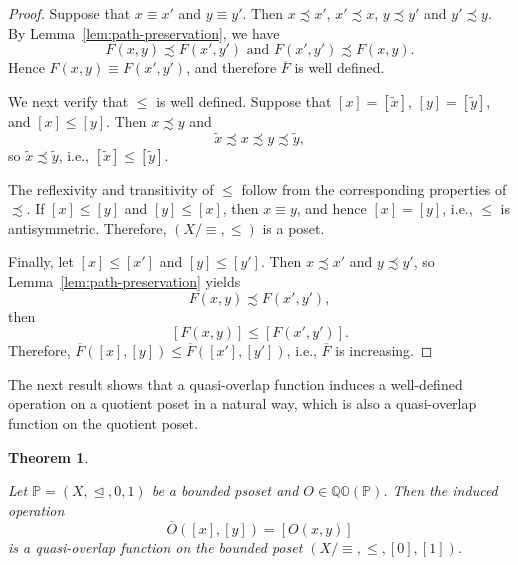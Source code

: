 \documentclass[preprint,12pt]{elsarticle}
\newtheorem{theorem}{Theorem}[section]
\begin{document}
\begin{proof}
Suppose that $x\equiv x'$ and $y\equiv y'$. Then $x\precsim x'$, $x'\precsim x$, $y\precsim y'$ and $y'\precsim y$. By Lemma~\ref{lem:path-preservation}, we have
$$
 F(x,y)\precsim F(x',y')\mbox{ and } F(x',y')\precsim F(x,y).
$$
Hence $F(x,y)\equiv F(x',y')$, and therefore $\overline F$ is well defined.

We next verify that $\leq$ is well defined. Suppose that $[x]=[\widetilde x]$, $[y]=[\widetilde y]$, and $[x]\leq[y]$. Then $x\precsim y$ and
$$
 \widetilde x\precsim x\precsim y\precsim\widetilde y,
$$
so $\widetilde x\precsim\widetilde y$, i.e., $[\widetilde x]\leq[\widetilde y]$.

The reflexivity and transitivity of $\leq$ follow from the corresponding properties of $\precsim$. If $[x]\leq[y]$ and $[y]\leq[x]$, then $x\equiv y$, and hence $[x]=[y]$, i.e., $\leq$ is antisymmetric. Therefore, $(X/{\equiv},\leq)$ is a poset.

Finally, let $[x]\leq[x']$ and $[y]\leq[y']$. Then $x\precsim x'$ and $y\precsim y'$, so Lemma~\ref{lem:path-preservation} yields
$$
 F(x,y)\precsim F(x',y'),
$$
then
$$
[F(x,y)]\leq [F(x',y')].
$$
Therefore, $\overline F([x],[y])\leq \overline F([x'],[y'])$, i.e., $\overline F$ is increasing.
\end{proof}

The next result shows that a quasi-overlap function induces a well-defined operation on a quotient poset in a natural way, which is also a quasi-overlap function on the quotient poset.
\begin{theorem}\label{thm:quotient-qo}

Let $\mathbb{P}=(X,\trianglelefteq,0,1)$ be a bounded psoset and $O\in\mathbb{QO}(\mathbb{P})$. Then the induced operation
$$
 \overline O([x],[y])=[O(x,y)]
$$
is a quasi-overlap function on the bounded poset $(X/{\equiv},\leq,[0],[1])$.
\end{theorem}
\end{document}
